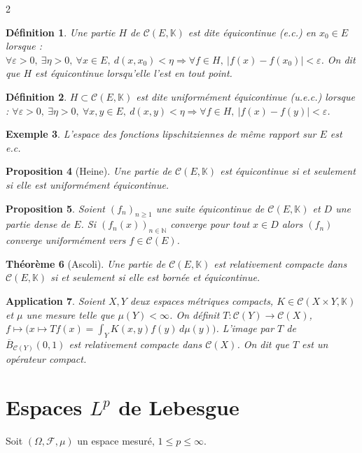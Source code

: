 \documentclass[10pt,a4paper]{article}
\theoremstyle{plan}
\newtheorem{theoreme}{Théorème}
\newtheorem{definition}[theoreme]{Définition}
\newtheorem{proposition}[theoreme]{Proposition}
\newtheorem{application}[theoreme]{Application}
\newtheorem{exemple}[theoreme]{Exemple}
\theoremstyle{planex}   %
\newcommand{\N}{\mathbb{N}}
\newcommand{\K}{\mathbb{K}}
\newcommand{\Cc}{\mathcal{C}}
\newcommand{\abs}[1]{\left\lvert #1\right\rvert}
\begin{document}
\begin{multicols}{2}
\begin{definition}
Une partie $H$ de $\Cc(E,\K)$ est dite équicontinue (e.c.) en $x_0 \in E$ lorsque : $\forall \varepsilon > 0,\ \exists \eta > 0,\ \forall x \in E,\ d(x,x_0) < \eta \Rightarrow \forall f \in H,\ \abs{f(x) - f(x_0)} < \varepsilon$. On dit que $H$ est équicontinue lorsqu'elle l'est en tout point.
\end{definition}

\begin{definition}
$H \subset \Cc(E,\K)$ est dite uniformément équicontinue (u.e.c.) lorsque : $\forall \varepsilon > 0,\ \exists \eta > 0,\ \forall x, y \in E,\ d(x,y) < \eta \Rightarrow \forall f \in H,\ \abs{f(x) - f(y)} < \varepsilon$.
\end{definition}

\begin{exemple}
L'espace des fonctions lipschitziennes de même rapport sur $E$ est e.c.
\end{exemple}

\begin{proposition}[Heine]
Une partie de $\Cc(E,\K)$ est équicontinue si et seulement si elle est uniformément équicontinue.
\end{proposition}

\begin{proposition}
Soient $(f_n)_{n \ge 1}$ une suite équicontinue de $\Cc(E,\K)$ et $D$ une partie dense de $E$. Si $(f_n(x))_{n \in \N}$ converge pour tout $x \in D$ alors $(f_n)$ converge uniformément vers $f \in \Cc(E)$.
\end{proposition}

\begin{theoreme}[Ascoli]
Une partie de $\Cc(E,\K)$ est relativement compacte dans $\Cc(E,\K)$ si et seulement si elle est bornée et équicontinue.
\end{theoreme}

\begin{application}
Soient $X, Y$ deux espaces métriques compacts, $K \in \Cc(X \times Y, \K)$ et $\mu$ une mesure telle que $\mu(Y) < \infty$. On définit $T : \Cc(Y) \to \Cc(X)$, $f \mapsto \big( x \mapsto Tf(x) = \int_Y K(x,y) f(y)\,d\mu(y) \big)$. L'image par $T$ de $\overline{B}_{\Cc(Y)}(0,1)$ est relativement compacte dans $\Cc(X)$. On dit que $T$ est un opérateur compact.
\end{application}

\section{Espaces $L^p$ de Lebesgue}
Soit $(\Omega, \mathcal{F}, \mu)$ un espace mesuré, $1 \le p \le \infty$.


\end{multicols}
\end{document}
